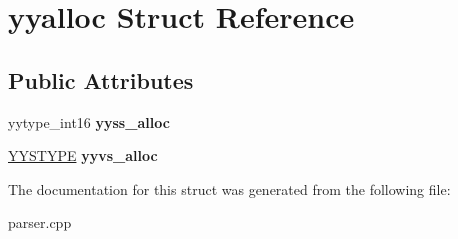 \hypertarget{structyyalloc}{
\section{yyalloc Struct Reference}
\label{structyyalloc}
}
\subsection*{Public Attributes}
\begin{DoxyCompactItemize}
\item 
\hypertarget{structyyalloc_a4800e0520a89a4789afa7b5d82197e65}{
yytype\_\-int16 {\bfseries yyss\_\-alloc}}
\label{structyyalloc_a4800e0520a89a4789afa7b5d82197e65}

\item 
\hypertarget{structyyalloc_a9326f4fdc6f737a929444427836d8928}{
\hyperlink{structYYSTYPE}{YYSTYPE} {\bfseries yyvs\_\-alloc}}
\label{structyyalloc_a9326f4fdc6f737a929444427836d8928}

\end{DoxyCompactItemize}


The documentation for this struct was generated from the following file:\begin{DoxyCompactItemize}
\item 
parser.cpp\end{DoxyCompactItemize}
